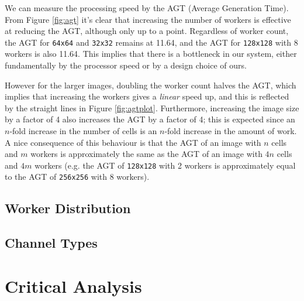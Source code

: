 \documentclass{article}
\begin{document}
    We can measure the processing speed by the AGT (Average Generation Time). From Figure \ref{fig:agt} it's clear that increasing the number of workers is effective at reducing the AGT, although only up to a point. Regardless of worker count, the AGT for \verb|64x64| and \verb|32x32| remains at 11.64, and the AGT for \verb|128x128| with 8 workers is also 11.64. This implies that there is a bottleneck in our system, either fundamentally by the processor speed or by a design choice of ours.

    However for the larger images, doubling the worker count halves the AGT, which implies that increasing the workers gives a \textit{linear} speed up, and this is reflected by the straight lines in Figure \ref{fig:agtplot}. Furthermore, increasing the image size by a factor of 4 also increases the AGT by a factor of 4; this is expected since an $n$-fold increase in the number of cells is an $n$-fold increase in the amount of work. A nice consequence of this behaviour is that the AGT of an image with $n$ cells and $m$ workers is approximately the same as the AGT of an image with $4n$ cells and $4m$ workers (e.g. the AGT of \verb|128x128| with 2 workers is approximately equal to the AGT of \verb|256x256| with 8 workers).

    \subsection{Worker Distribution} \label{workerdistribution}

    \subsection{Channel Types} \label{channeltypes}

    \pagebreak

    \section{Critical Analysis} \label{analysis}

\end{document}
